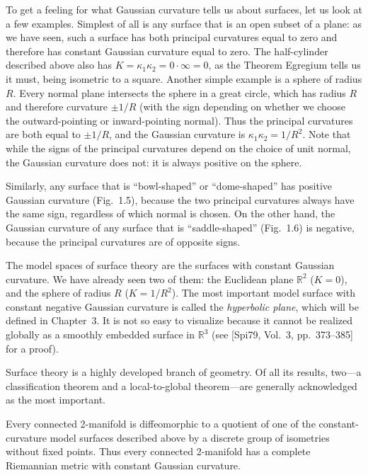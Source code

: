 
To get a feeling for what Gaussian curvature tells us about surfaces, let us look at a few examples. Simplest of all is any surface that is an open subset of a plane: as we have seen, such a surface has both principal curvatures equal to zero and therefore has constant Gaussian curvature equal to zero. The half-cylinder described above also has $K = \kappa_1 \kappa_2 = 0 \cdot \infty = 0$, as the Theorem Egregium tells us it must, being isometric to a square. Another simple example is a sphere of radius $R$. Every normal plane intersects the sphere in a great circle, which has radius $R$ and therefore curvature $\pm 1/R$ (with the sign depending on whether we choose the outward-pointing or inward-pointing normal). Thus the principal curvatures are both equal to $\pm 1/R$, and the Gaussian curvature is $\kappa_1 \kappa_2 = 1/R^2$. Note that while the signs of the principal curvatures depend on the choice of unit normal, the Gaussian curvature does not: it is always positive on the sphere.

Similarly, any surface that is ``bowl-shaped'' or ``dome-shaped'' has positive Gaussian curvature (Fig.~1.5), because the two principal curvatures always have the same sign, regardless of which normal is chosen. On the other hand, the Gaussian curvature of any surface that is ``saddle-shaped'' (Fig.~1.6) is negative, because the principal curvatures are of opposite signs.

The model spaces of surface theory are the surfaces with constant Gaussian curvature. We have already seen two of them: the Euclidean plane $\mathbb{R}^2$ ($K = 0$), and the sphere of radius $R$ ($K = 1/R^2$). The most important model surface with constant negative Gaussian curvature is called the \emph{hyperbolic plane}, which will be defined in Chapter~3. It is not so easy to visualize because it cannot be realized globally as a smoothly embedded surface in $\mathbb{R}^3$ (see [Spi79, Vol.~3, pp.~373--385] for a proof).

Surface theory is a highly developed branch of geometry. Of all its results, two---a classification theorem and a local-to-global theorem---are generally acknowledged as the most important.

\begin{theorem}
\label{thm:uniformization-theorem}
\notready
Every connected 2-manifold is diffeomorphic to a quotient of one of the constant-curvature model surfaces described above by a discrete group of isometries without fixed points. Thus every connected 2-manifold has a complete Riemannian metric with constant Gaussian curvature.
\end{theorem}

